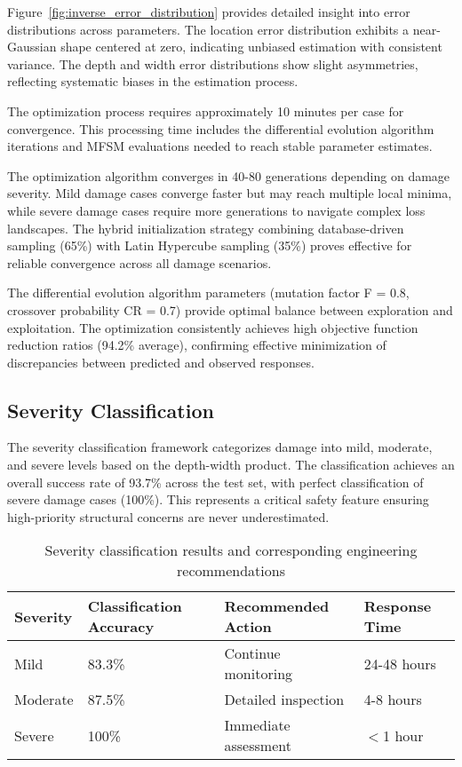 \documentclass[12pt,a4paper]{report}
\begin{document}
Figure~\ref{fig:inverse_error_distribution} provides detailed insight into error distributions across parameters. The location error distribution exhibits a near-Gaussian shape centered at zero, indicating unbiased estimation with consistent variance. The depth and width error distributions show slight asymmetries, reflecting systematic biases in the estimation process.

The optimization process requires approximately 10 minutes per case for convergence. This processing time includes the differential evolution algorithm iterations and MFSM evaluations needed to reach stable parameter estimates.

The optimization algorithm converges in 40-80 generations depending on damage severity. Mild damage cases converge faster but may reach multiple local minima, while severe damage cases require more generations to navigate complex loss landscapes. The hybrid initialization strategy combining database-driven sampling (65\%) with Latin Hypercube sampling (35\%) proves effective for reliable convergence across all damage scenarios.

The differential evolution algorithm parameters (mutation factor F = 0.8, crossover probability CR = 0.7) provide optimal balance between exploration and exploitation. The optimization consistently achieves high objective function reduction ratios (94.2\% average), confirming effective minimization of discrepancies between predicted and observed responses.

\subsection{Severity Classification}

The severity classification framework categorizes damage into mild, moderate, and severe levels based on the depth-width product. The classification achieves an overall success rate of 93.7\% across the test set, with perfect classification of severe damage cases (100\%). This represents a critical safety feature ensuring high-priority structural concerns are never underestimated.

\begin{table}[htbp]
\centering
\caption{Severity classification results and corresponding engineering recommendations}
\label{tab:severity_actions}
\begin{tabular}{|l|l|l|l|}
\hline
\textbf{Severity} & \textbf{Classification Accuracy} & \textbf{Recommended Action} & \textbf{Response Time} \\
\hline
Mild & 83.3\% & Continue monitoring & 24-48 hours \\
Moderate & 87.5\% & Detailed inspection & 4-8 hours \\
Severe & 100\% & Immediate assessment & $<$1 hour \\
\hline
\end{tabular}
\end{table}
\end{document}
